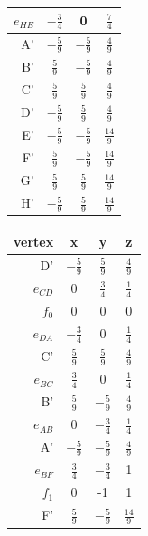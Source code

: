 \documentclass{article}
\begin{document}
\begin{center}
\begin{table}[!h]
\begin{minipage}{.5\linewidth}
\begin{tabular}{ | r | c | c | c | }
    $e_{HE}$ & $ -\frac{3}{4} $ & 0 & $ \frac{7}{4} $ \\ \hline
    A' & $ -\frac{5}{9} $ & $ -\frac{5}{9} $ & $ \frac{4}{9} $ \\ \hline
    B' & $ \frac{5}{9} $ & $ -\frac{5}{9} $ & $ \frac{4}{9} $ \\ \hline
    C' & $ \frac{5}{9} $ & $ \frac{5}{9} $ & $ \frac{4}{9} $ \\ \hline
    D' & $ -\frac{5}{9} $ & $ \frac{5}{9} $ & $ \frac{4}{9} $ \\ \hline
    E' & $ -\frac{5}{9} $ & $ -\frac{5}{9} $ & $ \frac{14}{9} $ \\ \hline    
    F' & $ \frac{5}{9} $ & $ -\frac{5}{9} $ & $ \frac{14}{9} $ \\ \hline
    G' & $ \frac{5}{9} $ & $ \frac{5}{9} $ & $ \frac{14}{9} $ \\ \hline    
    H' & $ -\frac{5}{9} $ & $ \frac{5}{9} $ & $ \frac{14}{9} $ \\ \hline
    \hline
  \end{tabular}
    \end{minipage}%
    \begin{minipage}{.5\linewidth}
      \centering
        \begin{tabular}{ | r | c | c | c | }
    \hline
    vertex & x & y & z \\ \hline
    D' & $ -\frac{5}{9} $ & $ \frac{5}{9} $ & $ \frac{4}{9} $ \\ \hline
    $e_{CD}$ & 0 & $ \frac{3}{4} $ & $ \frac{1}{4} $ \\ \hline
    $f_0$ & 0 & 0 & 0 \\ \hline
    $e_{DA}$ & $ -\frac{3}{4} $ & 0 & $ \frac{1}{4} $ \\ \hline
    C' & $ \frac{5}{9} $ & $ \frac{5}{9} $ & $ \frac{4}{9} $ \\ \hline    
    $e_{BC}$ & $ \frac{3}{4} $ & 0 & $ \frac{1}{4} $ \\ \hline
    B' & $ \frac{5}{9} $ & $ -\frac{5}{9} $ & $ \frac{4}{9} $ \\ \hline
    $e_{AB}$ & 0 & $ -\frac{3}{4} $ & $ \frac{1}{4} $ \\ \hline
    A' & $ -\frac{5}{9} $ & $ -\frac{5}{9} $ & $ \frac{4}{9} $ \\ \hline
    $e_{BF}$ & $ \frac{3}{4} $ & $ -\frac{3}{4} $ & 1 \\ \hline
    $f_1$ & 0 & -1 & 1 \\ \hline    
    F' & $ \frac{5}{9} $ & $ -\frac{5}{9} $ & $ \frac{14}{9} $ \\ \hline

\end{tabular}
\end{minipage}
\end{table}
\end{center}
\end{document}
